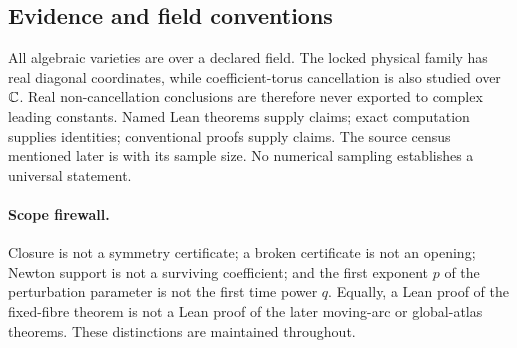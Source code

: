 \subsection{Evidence and field conventions}

All algebraic varieties are over a declared field.  The locked physical family
has real diagonal coordinates, while coefficient-torus cancellation is also
studied over \(\mathbb C\).  Real non-cancellation conclusions are therefore never
exported to complex leading constants.  Named Lean theorems supply
 claims; exact computation supplies
 identities; conventional proofs supply
 claims.  The source census mentioned later is
 with its sample size.  No numerical sampling establishes a
universal statement.

\paragraph{Scope firewall.}
Closure is not a symmetry certificate; a broken certificate is not an opening;
Newton support is not a surviving coefficient; and the first exponent $p$ of
the perturbation parameter is not the first time power $q$.  Equally, a Lean
proof of the fixed-fibre theorem is not a Lean proof of the later moving-arc or
global-atlas theorems.  These distinctions are maintained throughout.
